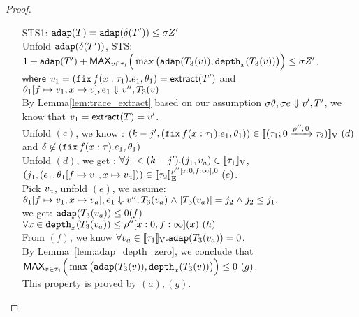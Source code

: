 \documentclass[a4paper,11pt]{article}
\theoremstyle{definition}
\begin{document}
\begin{proof}
\begin{mainitem}
\begin{enumerate}
\item [STS1:] $\adap(\tr) = \adap(\trop(\tr') )  \leq \ienv \nnatA'
  $\\
Unfold $\adap(\trop(\tr') ) $, STS:\\
 $1+ \adap(\tr') + \textsf{MAX}_{\valr \in \type_1} \Big(
                              \max \big(\adap(\tr_3 (\valr) ),
                              \ddep{x}(\tr_3(\valr)) \big) \Big) \leq
                              \ienv \nnatA' $. \\
      $\mathsf{where}$   $\valr_1 = (\efix f(x: \type_1). \expr_1, \env_1 ) =
                       \mathsf{extract}(\tr') $ and $  \env_1[f \mapsto
                       \valr_1, x \mapsto \valr], \expr_1 \bigstep
                       \valr'', \tr_3(\valr)  $\\
  By Lemma\ref{lem:trace_extract} based on our assumption $\ienv \env, \ienv \expr \bigstep \valr', \tr'$,  we know that $\valr_1 =
                       \mathsf{extract}(\tr) = v' $.\\
 Unfold $(c)$, we know : $(\stepiA - j',  (\efix f(x: \type_1). \expr_1, \env_1 ) ) \in \lrv{  (\tarr{ \type_1}{
      \type_2 }{0}{\dmap''}{0}) }~(d) $  and $ \delta \not\in  (\efix
  f(x: \type). \expr_1, \env_1 ) $  \\
  Unfold $(d)$, we get : $ \forall j_1 < (\stepiA-j'). (\stepiB_1,
  \valr_a) \in \lrv{\type_1} $, $  ( \stepiB_1, ( \expr_1 ,\env_1[f \mapsto
                       \valr_1, x \mapsto \valr_a]) )\in
                       \lre{\dmap''[x:0,f:\infty]}{0}{\type_2}~(e) $.\\  
   Pick $\valr_a$, unfold $(e)$, we assume:  $ \env_1[f \mapsto
                       \valr_1, x \mapsto \valr_a], \expr_1 \bigstep
                       \valr'', \tr_3(\valr_a)  \conj |\tr_3(\valr_a)|
                       = j_2 \conj j_2 \leq j_1.$
                       \\
   we get: $ \adap(\tr_3(\valr_a)) \leq 0 (f)$ \\
             $ \forall x \in \ddep{x}(\tr_3(\valr_a)) \leq
             \dmap''[x:0,f:\infty](x) ~(h)$ \\

  From $(f)$, we know $\forall \valr_a \in
  \lrv{\type_1}. \adap(\tr_3(\valr_a)) =0$. \\
 By Lemma~\ref{lem:adap_depth_zero}, we conclude that $ \textsf{MAX}_{\valr \in \type_1} \Big(
                              \max \big(\adap(\tr_3 (\valr) ),
                              \ddep{x}(\tr_3(\valr)) \big) \Big) \leq 0~(g) $.\\
           This property is proved by $(a),(g)$.


\end{enumerate}
\end{mainitem}
\end{proof}
\end{document}
